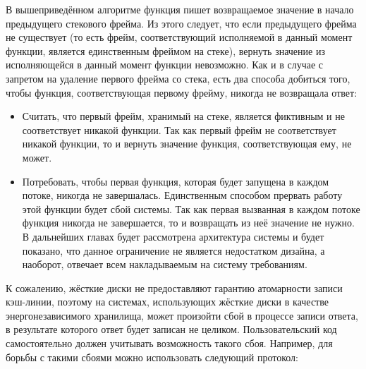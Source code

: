 \documentclass[times,specification,annotation]{itmo-student-thesis}
\begin{document}
В вышеприведённом алгоритме функция пишет возвращаемое значение в начало предыдущего стекового фрейма. Из этого следует, что если предыдущего фрейма не существует (то есть фрейм, соответствующий исполняемой в данный момент функции, является единственным фреймом на стеке), вернуть значение из исполняющейся в данный момент функции невозможно. Как и в случае с запретом на удаление первого фрейма со стека, есть два способа добиться того, чтобы  функция, соответствующая первому фрейму, никогда не возвращала ответ:

\begin{itemize}
    \item Считать, что первый фрейм, хранимый на стеке, является фиктивным и не соответствует никакой функции. Так как первый фрейм не соответствует никакой функции, то и вернуть значение функция, соответствующая ему, не может.
    
    \item Потребовать, чтобы первая функция, которая будет запущена в каждом потоке, никогда не завершалась. Единственным способом прервать работу этой функции будет сбой системы. Так как первая вызванная в каждом потоке функция никогда не завершается, то и возвращать из неё значение не нужно. В дальнейших главах будет рассмотрена архитектура системы и будет показано, что данное ограничение не является недостатком дизайна, а наоборот, отвечает всем накладываемым на систему требованиям.
\end{itemize}

К сожалению, жёсткие диски не предоставляют гарантию атомарности записи кэш-линии, поэтому на системах, использующих жёсткие диски в качестве энергонезависимого хранилища, может произойти сбой в процессе записи ответа, в результате которого ответ будет записан не целиком. Пользовательский код самостоятельно должен учитывать возможность такого сбоя. Например, для борьбы с такими сбоями можно использовать следующий протокол:
\end{document}

